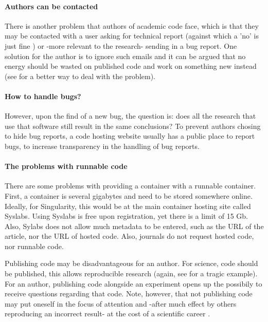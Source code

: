 \paragraph{Authors can be contacted}

There is another problem that authors of academic code face,
which is that they may be contacted with a user 
asking for technical report 
(against which a 'no' is just fine \cite{barnes2010publish})
or -more relevant to the research- sending in a bug report.
One solution for the author is to ignore such emails
and it can be argued that no energy should be wasted on published code
and work on something new instead 
(see \cite{barnes2010publish} for a better way to deal with the problem).

\paragraph{How to handle bugs?}

However, upon the find of a new bug, the question is:
does all the research that use that software still 
result in the same conclusions?
To prevent authors chosing to hide bug reports, 
a code hosting website usually has a public place to report bugs,
to increase transparency in the handling of bug reports.

\paragraph{The problems with runnable code}

There are some problems with providing a container with a runnable container.
First, a container is several gigabytes and need to be stored somewhere
online. 
Ideally, for Singularity, this would be at the main container hosting
site called Syslabs. Using Syslabs is free upon registration, 
yet there is a limit of 15 Gb. Also, Sylabs does not allow much metadata to
be entered, such as the URL of the article, nor the URL of hosted code.
Also, journals do not request hosted code, nor runnable code.


Publishing code may be disadvantageous for an author.
For science, code should be published, 
this allows reproducible research 
(again, see \cite{haibe2020importance} for a tragic example).
For an author, publishing code alongside an experiment opens up
the possibily to receive questions regarding that code.
Note, however, that not publishing code may put 
oneself in the focus of attention
and -after much effect by others reproducing an incorrect result-
at the cost of a scientific career \cite{baggerly2009deriving}.

